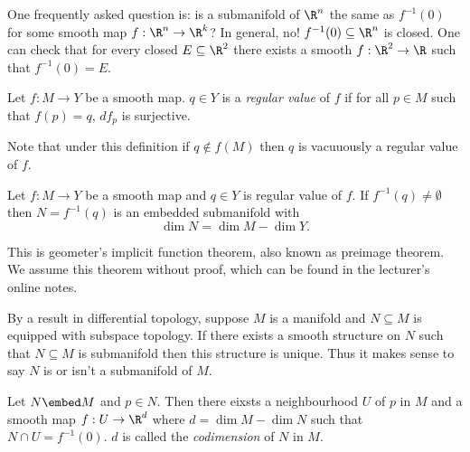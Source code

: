 \documentclass[a4paper]{article}
\begin{document}
One frequently asked question is: is a submanifold of \(\R^n\) the same as \(f^{-1}(0)\) for some smooth map \(f: \R^n \to \R^k\)? In general, no! \(f^{-1}(0) \subseteq \R^n\) is closed. One can check that for every closed \(E \subseteq \R^2\) there exists a smooth \(f: \R^2 \to \R\) such that \(f^{-1}(0) = E\).

\begin{definition}
  Let \(f: M \to Y\) be a smooth map. \(q \in Y\) is a \emph{regular value} of \(f\) if for all \(p \in M\) such that \(f(p) = q\), \(df_p\) is surjective.
\end{definition}
Note that under this definition if \(q \notin f(M)\) then \(q\) is vacuuously a regular value of \(f\).

\begin{theorem}
  Let \(f: M \to Y\) be a smooth map and \(q \in Y\) is regular value of \(f\). If \(f^{-1}(q) \neq \emptyset\) then \(N = f^{-1}(q)\) is an embedded submanifold with
  \[
    \dim N = \dim M - \dim Y.
  \]
\end{theorem}
This is geometer's implicit function theorem, also known as preimage theorem. We assume this theorem without proof, which can be found in the lecturer's online notes.

\begin{remark}
  By a result in differential topology, suppose \(M\) is a manifold and \(N \subseteq M\) is equipped with subspace topology. If there exists a smooth structure on \(N\) such that \(N \subseteq M\) is submanifold then this structure is unique. Thus it makes sense to say \(N\) is or isn't a submanifold of \(M\).
\end{remark}


\begin{proposition}
  Let \(N \embed M\) and \(p \in N\). Then there eixsts a neighbourhood \(U\) of \(p\) in \(M\) and a smooth map \(f: U \to \R^d\) where \(d = \dim M - \dim N\) such that \(N \cap U = f^{-1}(0)\). \(d\) is called the \emph{codimension} of \(N\) in \(M\).
\end{proposition}
\end{document}
